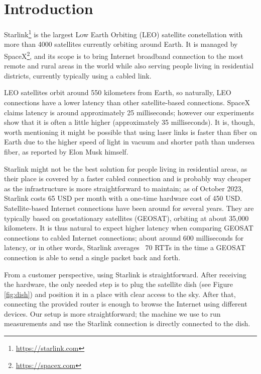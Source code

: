 \documentclass[IN,11pt,twoside,openright,idp,english]{tumthesis}
\begin{document}
\section{Introduction}
    
Starlink\footnote{\url{https://starlink.com}} is the largest Low Earth Orbiting (LEO) satellite constellation with more
than 4000 satellites currently orbiting around Earth. It is managed by SpaceX\footnote{\url{https://spacex.com}}, and
its scope is to bring Internet broadband connection to the most remote and rural areas in the world while also serving
people living in residential districts, currently typically using a cabled link.
    
LEO satellites orbit around 550 kilometers from Earth, so naturally, LEO connections have a lower latency than other
satellite-based connections. SpaceX claims latency is around approximately 25 milliseconds; however our experiments show
that it is often a little higher (approximately 35 milliseconds). It is, though, worth mentioning it might be possible
that using laser links is faster than fiber on Earth due to the higher speed of light in vacuum and shorter path than
undersea fiber, as reported by Elon Musk himself\cite{tweet}.

Starlink might not be the best solution for people living in residential areas, as their place is covered by a faster
cabled connection and is probably way cheaper as the infrastructure is more straightforward to maintain; as of October
2023, Starlink costs 65 USD per month with a one-time hardware cost of 450 USD. Satellite-based Internet connections
have been around for several years. They are typically based on geostationary satellites (GEOSAT), orbiting at about
35,000 kilometers. It is thus natural to expect higher latency when comparing GEOSAT connections to cabled Internet
connections; about around 600 milliseconds for latency, or in other words, Starlink averages ~70 RTTs in the time a
GEOSAT connection is able to send a single packet back and forth.
    
From a customer perspective, using Starlink is straightforward. After receiving the hardware, the only needed step is to
plug the satellite dish (see Figure \ref{fig:dish}) and position it in a place with clear access to the sky. After that,
connecting the provided router is enough to browse the Internet using different devices. Our setup is more
straightforward; the machine we use to run measurements and use the Starlink connection is directly connected to the
dish.
    
\end{document}
